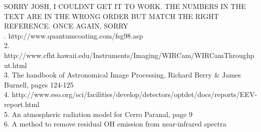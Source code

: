 \documentclass[pdf,color]{UoBnote}
\begin{document}
SORRY JOSH, I COULDNT GET IT TO WORK. THE NUMBERS IN THE TEXT ARE IN THE WRONG ORDER BUT MATCH THE RIGHT REFERENCE. ONCE AGAIN, SORRY\\
. http://www.quantumcoating.com/fsg98.asp
\\
2. http://www.cfht.hawaii.edu/Instruments/Imaging/WIRCam/WIRCamThroughput.html
\\
3. The handbook of Astronomical Image Processing, Richard Berry \& James Burnell, pages 124-125
\\
4. http://www.eso.org/sci/facilities/develop/detectors/optdet/docs/reports/EEV-report.html
\\
5. An atmospheric radiation model for Cerro Paranal, page 9
\\
6. A method to remove residual OH emission from near-infrared spectra
\end{document}
